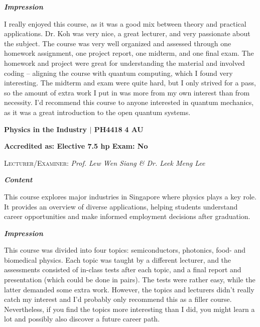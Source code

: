 {\large{\textbf{\textit{Impression}}}}
\vspace{-0.25cm}

I really enjoyed this course, as it was a good mix between theory and practical applications. Dr. Koh was very nice, a great lecturer, and very passionate about the subject. The course was very well organized and assessed through one homework assignment, one project report, one midterm, and one final exam. The homework and project were great for understanding the material and involved coding -- aligning the course with quantum computing, which I found very interesting. The midterm and exam were quite hard, but I only strived for a pass, so the amount of extra work I put in was more from my own interest than from necessity. I'd recommend this course to anyone interested in quantum mechanics, as it was a great introduction to the open quantum systems.

\vspace{-0.3cm}
\hrulefill

{\large{\textbf{Physics in the Industry $\vert$ PH4418} \hfill \textbf{4 AU}}}

\vspace{-0.3cm}
\textbf{Accredited as: Elective 7.5 hp \hfill Exam: No}

{\large{\textsc{Lecturer/Examiner:} \textit{Prof. Lew Wen Siang \& Dr. Leek Meng Lee}}} \vspace{0.25cm}

{\large{\textbf{\textit{Content}}}} 
\vspace{-0.25cm}

This course explores major industries in Singapore where physics plays a key role. It provides an overview of diverse applications, helping students understand career opportunities and make informed employment decisions after graduation.

{\large{\textbf{\textit{Impression}}}}
\vspace{-0.25cm}

This course was divided into four topics: semiconductors, photonics, food- and biomedical physics. Each topic was taught by a different lecturer, and the assessments consisted of in-class tests after each topic, and a final report and presentation (which could be done in pairs). The tests were rather easy, while the latter demanded some extra work. However, the topics and lecturers didn't really catch my interest and I'd probably only recommend this as a filler course. Nevertheless, if you find the topics more interesting than I did, you might learn a lot and possibly also discover a future career path.

